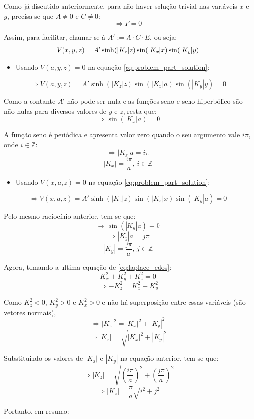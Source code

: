 \documentclass{report}
\begin{document}
Como já discutido anteriormente, para não haver solução trivial nas variáveis $ x $ e $ y $, precisa-se que $ A \neq 0 $ e $ C \neq 0 $:
$$ \Rightarrow F = 0 $$

Assim, para facilitar, chamar-se-á $ A' := A\cdot C\cdot E $, ou seja:
\begin{equation}
    \label{eq:problem_part_solution}
    \centering
    V(x, y, z) = A'\sinh(|K_z|z)\sin(|K_x|x)\sin(|K_y|y)
\end{equation}

\begin{itemize}
  \item Usando $ V(a, y, z) = 0 $ na equação \ref{eq:problem_part_solution}:
\end{itemize}
$$ \Rightarrow V(a, y, z) = A'\sinh(|K_z|z)\sin(|K_x|a)\sin(|K_y|y) = 0 $$

Como a contante $ A' $ não pode ser nula e as funções seno e seno hiperbólico são não nulas para diversos valores de $ y $ e $ z $, resta que:
$$ \Rightarrow \sin(|K_x|a) = 0 $$

A função seno é periódica e apresenta valor zero quando o seu argumento vale $ i\pi $, onde $ i \in \mathbb{Z} $:
$$ \Rightarrow |K_x|a = i\pi $$
$$ |K_x| = \frac{i\pi}{a},\, i \in \mathbb{Z} $$

\begin{itemize}
  \item Usando $ V(x, a, z) = 0 $ na equação \ref{eq:problem_part_solution}:
\end{itemize}
$$ \Rightarrow V(x, a, z) = A'\sinh(|K_z|z)\sin(|K_x|x)\sin(|K_y|a) = 0 $$

Pelo mesmo raciocínio anterior, tem-se que:
$$ \Rightarrow \sin(|K_y|a) = 0 $$
$$ \Rightarrow |K_y|a = j\pi $$
$$ |K_y| = \frac{j\pi}{a},\, j \in \mathbb{Z} $$

Agora, tomando a última equação de \ref{eq:laplace_edos}:
$$ K_x^2 + K_y^2 + K_z^2 = 0 $$
$$ \Rightarrow -K_z^2 = K_x^2 + K_y^2 $$

Como $ K_z^2 < 0 $, $ K_y^2 > 0 $ e $ K_x^2 > 0 $ e não há superposição entre essas variáveis (são vetores normais),
$$ \Rightarrow |K_z|^2 = |K_x|^2 + |K_y|^2 $$
$$ \Rightarrow |K_z| = \sqrt{|K_x|^2 + |K_y|^2} $$

Substituindo os valores de $ |K_x| $ e $ |K_y| $ na equação anterior, tem-se que:
$$ \Rightarrow |K_z| = \sqrt{\left(\frac{i\pi}{a}\right)^2 + \left(\frac{j\pi}{a}\right)^2} $$
$$ \Rightarrow |K_z| = \frac{\pi}{a}\sqrt{i^2 + j^2} $$

Portanto, em resumo:
\end{document}
